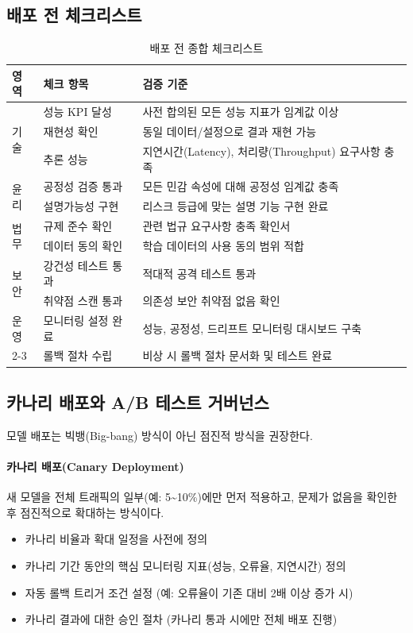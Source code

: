\subsection{배포 전 체크리스트}
\label{sec:10.6.2}

\begin{table}[htbp]
\centering
\caption{배포 전 종합 체크리스트}
\label{tab:deployment_checklist}
\begin{tabularx}{\textwidth}{p{2cm}p{4cm}X}
\toprule
\textbf{영역} & \textbf{체크 항목} & \textbf{검증 기준} \\
\midrule
\multirow{3}{*}{기술} & 성능 KPI 달성 & 사전 합의된 모든 성능 지표가 임계값 이상 \\
\cmidrule{2-3}
& 재현성 확인 & 동일 데이터/설정으로 결과 재현 가능 \\
\cmidrule{2-3}
& 추론 성능 & 지연시간(Latency), 처리량(Throughput) 요구사항 충족 \\
\midrule
\multirow{2}{*}{윤리} & 공정성 검증 통과 & 모든 민감 속성에 대해 공정성 임계값 충족 \\
\cmidrule{2-3}
& 설명가능성 구현 & 리스크 등급에 맞는 설명 기능 구현 완료 \\
\midrule
\multirow{2}{*}{법무} & 규제 준수 확인 & 관련 법규 요구사항 충족 확인서 \\
\cmidrule{2-3}
& 데이터 동의 확인 & 학습 데이터의 사용 동의 범위 적합 \\
\midrule
\multirow{2}{*}{보안} & 강건성 테스트 통과 & 적대적 공격 테스트 통과 \\
\cmidrule{2-3}
& 취약점 스캔 통과 & 의존성 보안 취약점 없음 확인 \\
\midrule
운영 & 모니터링 설정 완료 & 성능, 공정성, 드리프트 모니터링 대시보드 구축 \\
\cmidrule{2-3}
& 롤백 절차 수립 & 비상 시 롤백 절차 문서화 및 테스트 완료 \\
\bottomrule
\end{tabularx}
\end{table}

\subsection{카나리 배포와 A/B 테스트 거버넌스}
\label{sec:10.6.3}

모델 배포는 빅뱅(Big-bang) 방식이 아닌 점진적 방식을 권장한다.

\paragraph{카나리 배포(Canary Deployment)}
새 모델을 전체 트래픽의 일부(예: 5\textasciitilde{}10\%)에만 먼저 적용하고, 문제가 없음을 확인한 후 점진적으로 확대하는 방식이다.
\begin{itemize}
  \item 카나리 비율과 확대 일정을 사전에 정의
  \item 카나리 기간 동안의 핵심 모니터링 지표(성능, 오류율, 지연시간) 정의
  \item 자동 롤백 트리거 조건 설정 (예: 오류율이 기존 대비 2배 이상 증가 시)
  \item 카나리 결과에 대한 승인 절차 (카나리 통과 시에만 전체 배포 진행)
\end{itemize}

